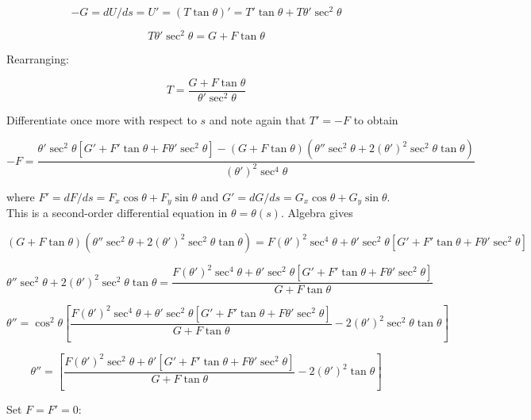\documentclass{article}
\begin{document}
\begin{equation}
  -G=dU/ds=U'=(T\tan\theta)'=T'\tan\theta + T\theta'\sec^2\theta
\end{equation}


\begin{equation}
  T\theta'\sec^2\theta=G+F\tan\theta
\end{equation}

Rearranging:

\begin{equation}
T=\frac{G+F\tan\theta}{\theta'\sec^2\theta}
\end{equation}

Differentiate once more with respect to $s$ and note again that
$T'=-F$ to obtain

\begin{equation}
  -F=\frac
{    \theta'\sec^2\theta\left[G'+F'\tan\theta+F\theta'\sec^2\theta\right]-(G+F\tan\theta)(\theta''\sec^2\theta+2(\theta')^2\sec^2\theta\tan\theta)
  }{
    (\theta')^2\sec^4\theta
  }
\end{equation}

where $F'=dF/ds=F_x\cos\theta+F_y\sin\theta$ and
$G'=dG/ds=G_x\cos\theta+G_y\sin\theta$.  This is a second-order
differential equation in $\theta=\theta(s)$.
Algebra gives


\begin{equation}
  (G+F\tan\theta)(\theta''\sec^2\theta+2(\theta')^2\sec^2\theta\tan\theta)=
  F(\theta')^2\sec^4\theta+
    \theta'\sec^2\theta\left[G'+F'\tan\theta+F\theta'\sec^2\theta\right]
\end{equation}

\begin{equation}
\theta''\sec^2\theta+2(\theta')^2\sec^2\theta\tan\theta=\frac{
  F(\theta')^2\sec^4\theta+
    \theta'\sec^2\theta\left[G'+F'\tan\theta+F\theta'\sec^2\theta\right]}{G+F\tan\theta}
\end{equation}


\begin{equation}
  \theta''=\cos^2\theta\left[\frac{
  F(\theta')^2\sec^4\theta+
    \theta'\sec^2\theta\left[G'+F'\tan\theta+F\theta'\sec^2\theta\right]}{G+F\tan\theta}
-2(\theta')^2\sec^2\theta\tan\theta\right]
\end{equation}

\begin{equation}
  \theta''=\left[\frac{
  F(\theta')^2\sec^2\theta+
    \theta'\left[G'+F'\tan\theta+F\theta'\sec^2\theta\right]}{G+F\tan\theta}
-2(\theta')^2\tan\theta\right]
\end{equation}

Set $F=F'=0$:


  


\end{document}
